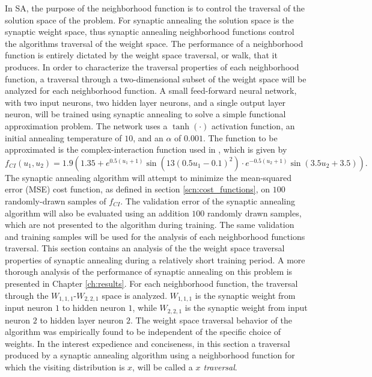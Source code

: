 \documentclass[11pt]{afthesis}
\begin{document}
	In SA, the purpose of the neighborhood function is to control the traversal of the solution space of the problem. For synaptic annealing the solution space is the synaptic weight space, thus synaptic annealing neighborhood functions control the algorithms traversal of the weight space. The performance of a neighborhood function is entirely dictated by the weight space traversal, or walk, that it produces. In order to characterize the traversal properties of each neighborhood function, a traversal through a two-dimensional subset of the weight space will be analyzed for each neighborhood function. A small feed-forward neural network, with two input neurons, two hidden layer neurons, and a single output layer neuron, will be trained using synaptic annealing to solve a simple functional approximation problem. The network uses a $\tanh(\cdot)$ activation function, an initial annealing temperature of $10$, and an $\alpha$ of $0.001$. The function to be approximated is the complex-interaction function used in \cite{lee2007improvinggeneralizationcapabilitynnusingsa}, which is given by \begin{equation}
	f_{CI}(u_1,u_2) = 1.9(1.35 + e^{0.5(u_1+1)} \sin ( 13 (0.5 u_1 - 0.1 )^2 ) · e^{−0.5(u_2+1)} \sin(3.5u_2 + 3.5)).
	\end{equation}
	The synaptic annealing algorithm will attempt to minimize the mean-squared error (MSE) cost function, as defined in section \ref{scn:cost_functions}, on $100$ randomly-drawn samples of $f_{CI}$. The validation error of the synaptic annealing algorithm will also be evaluated using an addition $100$ randomly drawn samples, which are not presented to the algorithm during training. The same validation and training samples will be used for the analysis of each neighborhood functions traversal.  This section contains an analysis of the the weight space traversal properties of synaptic annealing during a relatively short training period. A more thorough analysis of the performance of synaptic annealing on this problem is presented in Chapter \ref{ch:results}. For each neighborhood function, the traversal through the $W_{1,1,1}$-$W_{2,2,1}$ space is analyzed. $W_{1,1,1}$ is the synaptic weight from input neuron $1$ to hidden neuron $1$, while $W_{2,2,1}$ is the synaptic weight from input neuron $2$ to hidden layer neuron $2$. The weight space traversal behavior of the algorithm was empirically found to be independent of the specific choice of weights. In the interest expedience and conciseness, in this section a traversal produced by a synaptic annealing algorithm using a neighborhood function for which the visiting distribution is $x$, will be called a \textit{$x$ traversal}. 
\end{document}
